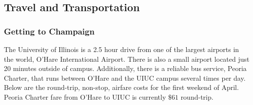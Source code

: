 \subsection{Travel and Transportation}

\subsubsection{Getting to Champaign}
The University of Illinois is a 2.5 hour drive from one of the largest airports in the world, O'Hare International Airport. There is also a small airport located just 20 minutes outside of campus. Additionally, there is a reliable bus service, Peoria Charter, that runs between O'Hare and the UIUC campus several times per day. Below are the round-trip, non-stop, airfare costs for the first weekend of April. Peoria Charter fare from O'Hare to UIUC is currently $\$61$ round-trip.   

